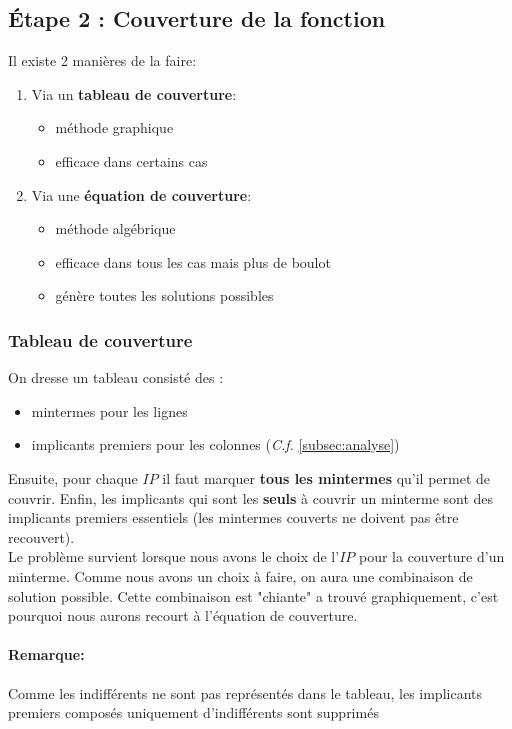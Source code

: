 \subsection{Étape 2 : Couverture de la fonction}
Il existe 2 manières de la faire:
\begin{enumerate}
	\item Via un \textbf{tableau de couverture}:
	\begin{itemize}
		\item méthode graphique
		\item efficace dans certains cas
	\end{itemize}
	\item Via une \textbf{équation de couverture}:
	\begin{itemize}
		\item méthode algébrique
		\item efficace dans tous les cas mais plus de boulot
		\item génère toutes les solutions possibles
	\end{itemize}
\end{enumerate}
\subsubsection{Tableau de couverture}
On dresse un tableau consisté des :
\begin{itemize}
	\item mintermes pour les lignes
	\item implicants premiers pour les colonnes (\textit{C.f.} \autoref{subsec:analyse})
\end{itemize}
Ensuite, pour chaque $IP$ il faut marquer \textbf{tous les mintermes} qu'il permet de couvrir. Enfin, les implicants qui sont les \textbf{seuls} à couvrir un minterme sont des implicants premiers essentiels (les mintermes couverts ne doivent pas être recouvert).\\

Le problème survient lorsque nous avons le choix de l'$IP$ pour la couverture d'un minterme. Comme nous avons un choix à faire, on aura une combinaison de solution possible. Cette combinaison est "chiante" a trouvé graphiquement, c'est pourquoi nous aurons recourt à l'équation de couverture.

\paragraph{Remarque:} Comme les indifférents ne sont pas représentés dans le tableau, les implicants premiers composés uniquement d'indifférents sont supprimés
